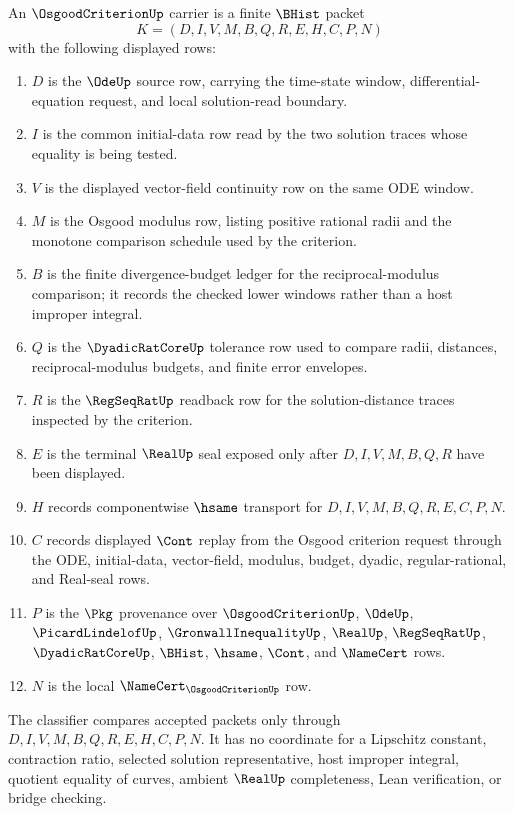 \begin{definition}
\label{def:osgood-criterion-carrier}
An $\OsgoodCriterionUp$ carrier is a finite $\BHist$ packet
$$
K=(D,I,V,M,B,Q,R,E,H,C,P,N)
$$
with the following displayed rows:
\begin{enumerate}
\item $D$ is the $\OdeUp$ source row, carrying the time-state window, differential-equation request, and local solution-read boundary.
\item $I$ is the common initial-data row read by the two solution traces whose equality is being tested.
\item $V$ is the displayed vector-field continuity row on the same ODE window.
\item $M$ is the Osgood modulus row, listing positive rational radii and the monotone comparison schedule used by the criterion.
\item $B$ is the finite divergence-budget ledger for the reciprocal-modulus comparison; it records the checked lower windows rather than a host improper integral.
\item $Q$ is the $\DyadicRatCoreUp$ tolerance row used to compare radii, distances, reciprocal-modulus budgets, and finite error envelopes.
\item $R$ is the $\RegSeqRatUp$ readback row for the solution-distance traces inspected by the criterion.
\item $E$ is the terminal $\RealUp$ seal exposed only after $D,I,V,M,B,Q,R$ have been displayed.
\item $H$ records componentwise $\hsame$ transport for $D,I,V,M,B,Q,R,E,C,P,N$.
\item $C$ records displayed $\Cont$ replay from the Osgood criterion request through the ODE, initial-data, vector-field, modulus, budget, dyadic, regular-rational, and Real-seal rows.
\item $P$ is the $\Pkg$ provenance over $\OsgoodCriterionUp$, $\OdeUp$, $\PicardLindelofUp$, $\GronwallInequalityUp$, $\RealUp$, $\RegSeqRatUp$, $\DyadicRatCoreUp$, $\BHist$, $\hsame$, $\Cont$, and $\NameCert$ rows.
\item $N$ is the local $\NameCert_{\OsgoodCriterionUp}$ row.
\end{enumerate}
The classifier compares accepted packets only through $D,I,V,M,B,Q,R,E,H,C,P,N$. It has no coordinate for a Lipschitz constant, contraction ratio, selected solution representative, host improper integral, quotient equality of curves, ambient $\RealUp$ completeness, Lean verification, or bridge checking.
\end{definition}

